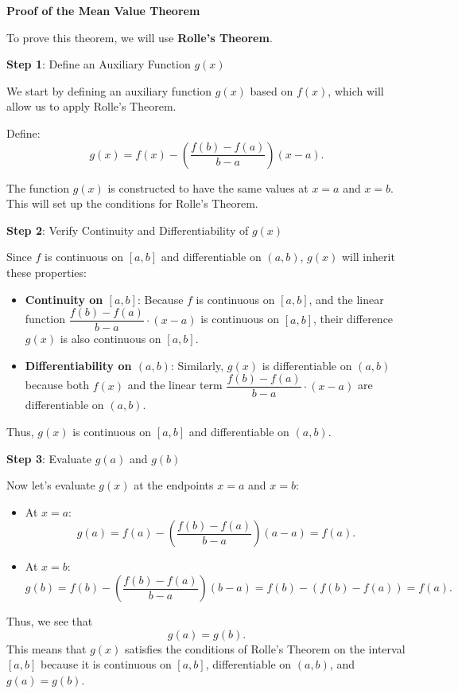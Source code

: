 \documentclass[a4paper,12pt]{book}
\begin{document}
\textbf{Proof of the Mean Value Theorem}

To prove this theorem, we will use \textbf{Rolle's Theorem}.

\textbf{Step 1}: Define an Auxiliary Function \( g(x) \)

We start by defining an auxiliary function \( g(x) \) based on \( f(x) \), which will allow us to apply Rolle's Theorem.

Define:
\[
g(x) = f(x) - \left( \dfrac{f(b) - f(a)}{b - a} \right) (x - a).
\]

The function \( g(x) \) is constructed to have the same values at \( x = a \) and \( x = b \). This will set up the conditions for Rolle's Theorem.

\textbf{Step 2}: Verify Continuity and Differentiability of \( g(x) \)

Since \( f \) is continuous on \([a, b]\) and differentiable on \((a, b)\), \( g(x) \) will inherit these properties:

\begin{itemize}
	\item 
	\textbf{Continuity on \([a, b]\)}: Because \( f \) is continuous on \([a, b]\), and the linear function \(\dfrac{f(b) - f(a)}{b - a} \cdot (x - a)\) is continuous on \([a, b]\), their difference \( g(x) \) is also continuous on \([a, b]\).
	\item
	\textbf{Differentiability on \((a, b)\)}: Similarly, \( g(x) \) is differentiable on \((a, b)\) because both \( f(x) \) and the linear term \(\dfrac{f(b) - f(a)}{b - a} \cdot (x - a)\) are differentiable on \((a, b)\).
\end{itemize}

Thus, \( g(x) \) is continuous on \([a, b]\) and differentiable on \((a, b)\).

\textbf{Step 3}: Evaluate \( g(a) \) and \( g(b) \)

Now let’s evaluate \( g(x) \) at the endpoints \( x = a \) and \( x = b \):

\begin{itemize}
	\item
	At \( x = a \):
	\[
	g(a) = f(a) - \left( \dfrac{f(b) - f(a)}{b - a} \right) (a - a) = f(a).
	\]
	\item
	At \( x = b \):
	\[
	g(b) = f(b) - \left( \dfrac{f(b) - f(a)}{b - a} \right) (b - a) = f(b) - (f(b) - f(a)) = f(a).
	\]	
\end{itemize}



Thus, we see that
\[
g(a) = g(b).
\]
This means that \( g(x) \) satisfies the conditions of Rolle's Theorem on the interval \([a, b]\) because it is continuous on \([a, b]\), differentiable on \((a, b)\), and \( g(a) = g(b) \).
\end{document}
